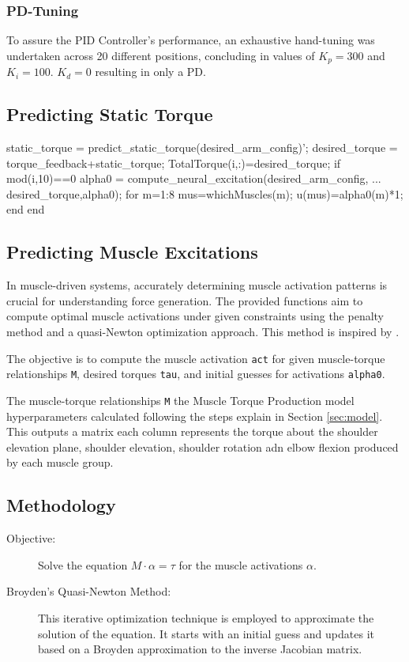 \subsubsection{PD-Tuning}
To assure the PID Controller's performance, an exhaustive hand-tuning was undertaken across 20 different positions, concluding in values of \(K_p = 300\) and \(K_i = 100\). \(K_d = 0\) resulting in only a PD. 

\subsection{Predicting Static Torque}
static_torque = predict_static_torque(desired_arm_config)';
desired_torque = torque_feedback+static_torque;
TotalTorque(i,:)=desired_torque;
if mod(i,10)==0
    alpha0 = compute_neural_excitation(desired_arm_config, ...
        desired_torque,alpha0);
    for m=1:8
        mus=whichMuscles(m);
        u(mus)=alpha0(m)*1;
    end            
end

\subsection{Predicting Muscle Excitations}\label{computemuscleexcitation}

In muscle-driven systems, accurately determining muscle activation patterns is crucial for understanding force generation. The provided functions aim to compute optimal muscle activations under given constraints using the penalty method and a quasi-Newton optimization approach. This method is inspired by \cite{QSC}.

The objective is to compute the muscle activation \texttt{act} for given muscle-torque relationships \texttt{M}, desired torques \texttt{tau}, and initial guesses for activations \texttt{alpha0}.

The muscle-torque relationships \texttt{M} the Muscle Torque Production model hyperparameters calculated following the steps explain in Section \ref{sec:model}. This outputs a matrix each column represents the torque about the shoulder elevation plane, shoulder elevation, shoulder rotation adn elbow flexion produced by each muscle group. 

\subsection{Methodology}
\begin{description}
    \item[Objective:] Solve the equation \( M \cdot \alpha = \tau \) for the muscle activations \( \alpha \).
    \item[Broyden's Quasi-Newton Method:] This iterative optimization technique is employed to approximate the solution of the equation. It starts with an initial guess and updates it based on a Broyden approximation to the inverse Jacobian matrix.
\end{description}

